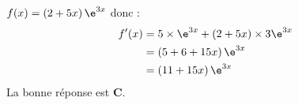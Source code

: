 \medskip

$f(x)=\left (2+5x\right ) \e^{3x}$ donc :
\begin{align*}
f'(x) &= 5\times \e^{3x} + \left (2+5x\right )\times 3\e^{3x} \\
&= \left (5+6+15x\right ) \e^{3x} \\
&= \left (11+15x\right )\e^{3x}
\end{align*}
La bonne réponse est \textbf{C}.

\bigskip
